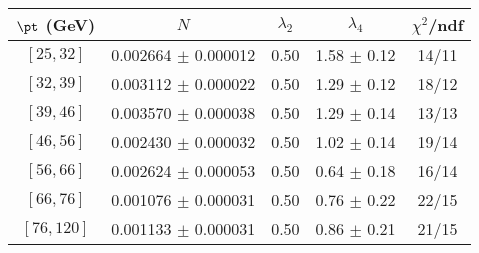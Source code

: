 \begin{tabular}{c||c|c|c|c}
$\pt$ (GeV) & $N$ & $\lambda_{2}$ & $\lambda_4$  & $\chi^2$/ndf  \\
\hline
$[25, 32]$ & 0.002664 $\pm$ 0.000012 & 0.50 & 1.58 $\pm$ 0.12 & 14/11\\
$[32, 39]$ & 0.003112 $\pm$ 0.000022 & 0.50 & 1.29 $\pm$ 0.12 & 18/12\\
$[39, 46]$ & 0.003570 $\pm$ 0.000038 & 0.50 & 1.29 $\pm$ 0.14 & 13/13\\
$[46, 56]$ & 0.002430 $\pm$ 0.000032 & 0.50 & 1.02 $\pm$ 0.14 & 19/14\\
$[56, 66]$ & 0.002624 $\pm$ 0.000053 & 0.50 & 0.64 $\pm$ 0.18 & 16/14\\
$[66, 76]$ & 0.001076 $\pm$ 0.000031 & 0.50 & 0.76 $\pm$ 0.22 & 22/15\\
$[76, 120]$ & 0.001133 $\pm$ 0.000031 & 0.50 & 0.86 $\pm$ 0.21 & 21/15\\
\end{tabular}
